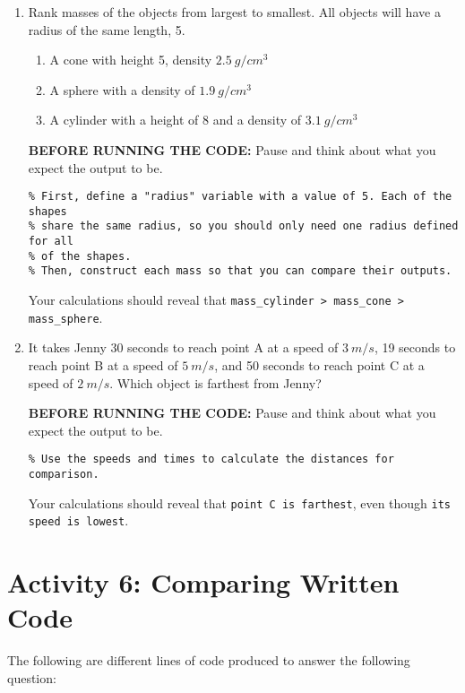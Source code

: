 \documentclass{ximera}
\begin{document}
\begin{enumerate}
    \item Rank masses of the objects from largest to smallest. All objects will have a radius of the same length, 5.
    \begin{enumerate}
        \item A cone with height 5, density $2.5\ g/cm^3$
        \item A sphere with a density of $1.9\ g/cm^3$
        \item A cylinder with a height of 8 and a density of $3.1\ g/cm^3$
    \end{enumerate}

    \textbf{BEFORE RUNNING THE CODE:} Pause and think about what you expect the output to be.

    \begin{verbatim}
% First, define a "radius" variable with a value of 5. Each of the shapes
% share the same radius, so you should only need one radius defined for all
% of the shapes.
% Then, construct each mass so that you can compare their outputs.
    \end{verbatim}

    Your calculations should reveal that \texttt{mass\_cylinder > mass\_cone > mass\_sphere}.
    
    \item It takes Jenny 30 seconds to reach point A at a speed of $3\ m/s$, 19 seconds to reach point B at a speed of $5\ m/s$, and 50 seconds to reach point C at a speed of $2\ m/s$. Which object is farthest from Jenny?

    \textbf{BEFORE RUNNING THE CODE:} Pause and think about what you expect the output to be.

    \begin{verbatim}
% Use the speeds and times to calculate the distances for comparison.
    \end{verbatim}

    Your calculations should reveal that \texttt{point C is farthest}, even though \texttt{its speed is lowest}.
\end{enumerate}

\section*{Activity 6: Comparing Written Code}

The following are different lines of code produced to answer the following question:
\end{document}
